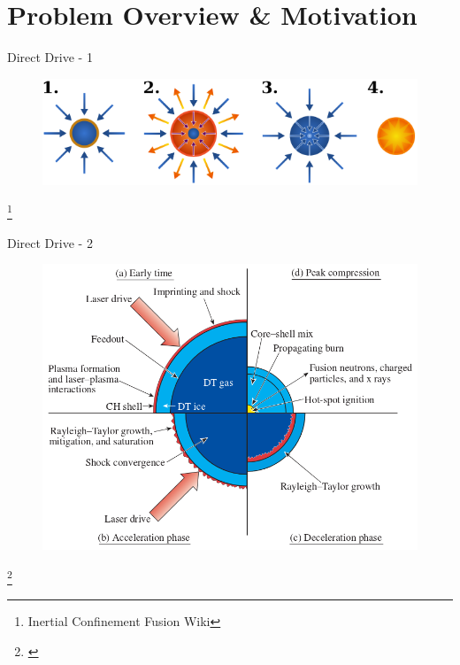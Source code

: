 
\begin{frame}[t,plain]
  \titlepage
\end{frame}

\section{Problem Overview \& Motivation}

%
\begin{frame}[t, label=current]{Direct Drive - 1}
 \begin{figure}[!htbp]
   \includegraphics[width=0.8\linewidth]{fig/600pxICF.png}
   \centering
 \end{figure}
 \footnote{Inertial Confinement Fusion Wiki}
\end{frame}


\begin{frame}[t, label=current]{Direct Drive - 2}
  \vspace{-0.5cm}
  \begin{figure}[!htbp]
   \includegraphics[width=0.55\linewidth]{../fig/DDfusion}
   \centering
  \end{figure}
 \footnote{\cite{craxton2015}}


\end{frame}



